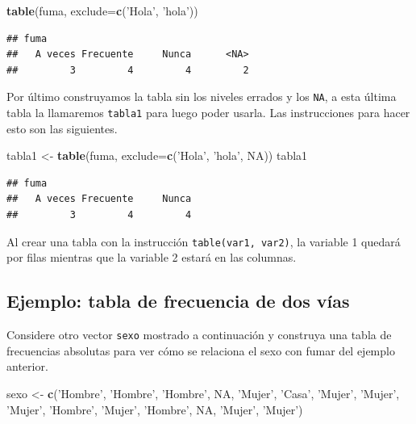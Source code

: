 \documentclass[10pt,]{krantz}
\makeatletter
\newenvironment{Shaded}{\begin{snugshade}}{\end{snugshade}}
\newcommand{\KeywordTok}[1]{\textcolor[rgb]{0.13,0.29,0.53}{\textbf{#1}}}
\newcommand{\DataTypeTok}[1]{\textcolor[rgb]{0.13,0.29,0.53}{#1}}
\newcommand{\StringTok}[1]{\textcolor[rgb]{0.31,0.60,0.02}{#1}}
\newcommand{\OtherTok}[1]{\textcolor[rgb]{0.56,0.35,0.01}{#1}}
\newcommand{\NormalTok}[1]{#1}
\newenvironment{kframe}{%
\medskip{}
\setlength{\fboxsep}{.8em}
 \def\at@end@of@kframe{}%
 \ifinner\ifhmode%
  \def\at@end@of@kframe{\end{minipage}}%
  \begin{minipage}{\columnwidth}%
 \fi\fi%
 \def\FrameCommand##1{\hskip\@totalleftmargin \hskip-\fboxsep
 \colorbox{shadecolor}{##1}\hskip-\fboxsep
     \hskip-\linewidth \hskip-\@totalleftmargin \hskip\columnwidth}%
 \MakeFramed {\advance\hsize-\width
   \@totalleftmargin\z@ \linewidth\hsize
   \@setminipage}}%
 {\par\unskip\endMakeFramed%
 \at@end@of@kframe}
\renewenvironment{Shaded}{\begin{kframe}}{\end{kframe}}
\let\BeginKnitrBlock\begin \let\EndKnitrBlock\end
\makeatother
\begin{document}
\begin{Shaded}
\begin{Highlighting}[]
\KeywordTok{table}\NormalTok{(fuma, }\DataTypeTok{exclude=}\KeywordTok{c}\NormalTok{(}\StringTok{'Hola'}\NormalTok{, }\StringTok{'hola'}\NormalTok{))}
\end{Highlighting}
\end{Shaded}

\begin{verbatim}
## fuma
##   A veces Frecuente     Nunca      <NA> 
##         3         4         4         2
\end{verbatim}

Por último construyamos la tabla sin los niveles errados y los
\texttt{NA}, a esta última tabla la llamaremos \texttt{tabla1} para
luego poder usarla. Las instrucciones para hacer esto son las
siguientes.

\begin{Shaded}
\begin{Highlighting}[]
\NormalTok{tabla1 <-}\StringTok{ }\KeywordTok{table}\NormalTok{(fuma, }\DataTypeTok{exclude=}\KeywordTok{c}\NormalTok{(}\StringTok{'Hola'}\NormalTok{, }\StringTok{'hola'}\NormalTok{, }\OtherTok{NA}\NormalTok{))}
\NormalTok{tabla1}
\end{Highlighting}
\end{Shaded}

\begin{verbatim}
## fuma
##   A veces Frecuente     Nunca 
##         3         4         4
\end{verbatim}

\BeginKnitrBlock{rmdnote}
Al crear una tabla con la instrucción \texttt{table(var1,\ var2)}, la
variable 1 quedará por filas mientras que la variable 2 estará en las
columnas.
\EndKnitrBlock{rmdnote}

\subsection*{Ejemplo: tabla de frecuencia de dos
vías}\label{ejemplo-tabla-de-frecuencia-de-dos-vias}

Considere otro vector \texttt{sexo} mostrado a continuación y construya
una tabla de frecuencias absolutas para ver cómo se relaciona el sexo
con fumar del ejemplo anterior.

\begin{Shaded}
\begin{Highlighting}[]
\NormalTok{sexo <-}\StringTok{ }\KeywordTok{c}\NormalTok{(}\StringTok{'Hombre'}\NormalTok{, }\StringTok{'Hombre'}\NormalTok{, }\StringTok{'Hombre'}\NormalTok{, }\OtherTok{NA}\NormalTok{, }\StringTok{'Mujer'}\NormalTok{,}
          \StringTok{'Casa'}\NormalTok{, }\StringTok{'Mujer'}\NormalTok{, }\StringTok{'Mujer'}\NormalTok{, }\StringTok{'Mujer'}\NormalTok{, }\StringTok{'Hombre'}\NormalTok{, }\StringTok{'Mujer'}\NormalTok{, }
          \StringTok{'Hombre'}\NormalTok{, }\OtherTok{NA}\NormalTok{, }\StringTok{'Mujer'}\NormalTok{, }\StringTok{'Mujer'}\NormalTok{)}
\end{Highlighting}
\end{Shaded}
\end{document}
